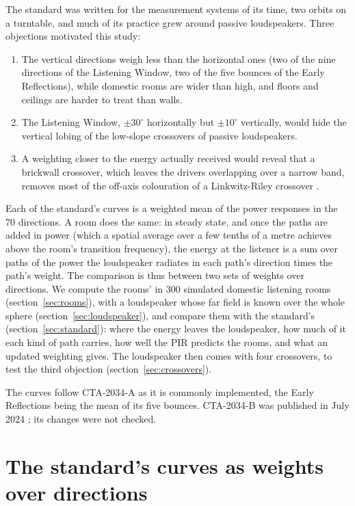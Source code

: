 \documentclass[11pt,a4paper]{article}
\begin{document}
The standard was written for the measurement systems of its time, two orbits on a turntable, and
much of its practice grew around passive loudspeakers. Three objections motivated this study:

\begin{enumerate}
\item The vertical directions weigh less than the horizontal ones (two of the nine directions of the
Listening Window, two of the five bounces of the Early Reflections), while domestic rooms are wider
than high, and floors and ceilings are harder to treat than walls.
\item The Listening Window, $\pm30^\circ$ horizontally but $\pm10^\circ$ vertically, would hide the
vertical lobing of the low-slope crossovers of passive loudspeakers.
\item A weighting closer to the energy actually received would reveal that a brickwall crossover,
which leaves the drivers overlapping over a narrow band, removes most of the off-axis colouration of
a Linkwitz-Riley crossover \cite{demion2026}.
\end{enumerate}

Each of the standard's curves is a weighted mean of the power responses in the 70 directions. A room
does the same: in steady state, and once the paths are added in power (which a spatial average over
a few tenths of a metre achieves above the room's transition frequency), the energy at the listener
is a sum over paths of the power the loudspeaker radiates in each path's direction times the path's
weight. The comparison is thus between two sets of weights over directions. We compute the rooms'
in 300 simulated domestic listening rooms (section~\ref{sec:rooms}), with a loudspeaker whose far
field is known over the whole sphere (section~\ref{sec:loudspeaker}), and compare them with the
standard's (section~\ref{sec:standard}): where the energy leaves the loudspeaker, how much of it each
kind of path carries, how well the PIR predicts the rooms, and what an updated weighting gives. The
loudspeaker then comes with four crossovers, to test the third objection
(section~\ref{sec:crossovers}).

The curves follow CTA-2034-A as it is commonly implemented, the Early Reflections being the mean of
its five bounces. CTA-2034-B was published in July 2024 \cite{cta2034b}; its changes were not checked.

\section{The standard's curves as weights over directions}
\label{sec:cta}
\end{document}
